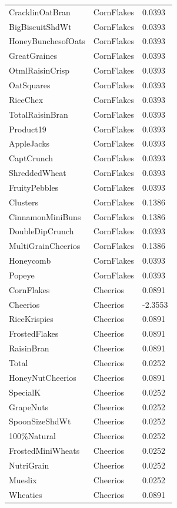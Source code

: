 \begin{table}[!htbp]
\begin{tabular}{lll}
\\
CracklinOatBran & CornFlakes & 0.0393
\\
BigBiscuitShdWt & CornFlakes & 0.0393
\\
HoneyBunchesofOats & CornFlakes & 0.0393
\\
GreatGraines & CornFlakes & 0.0393
\\
OtmlRaisinCrisp & CornFlakes & 0.0393
\\
OatSquares & CornFlakes & 0.0393
\\
RiceChex & CornFlakes & 0.0393
\\
TotalRaisinBran & CornFlakes & 0.0393
\\
Product19 & CornFlakes & 0.0393
\\
AppleJacks & CornFlakes & 0.0393
\\
CaptCrunch & CornFlakes & 0.0393
\\
ShreddedWheat & CornFlakes & 0.0393
\\
FruityPebbles & CornFlakes & 0.0393
\\
Clusters & CornFlakes & 0.1386
\\
CinnamonMiniBuns & CornFlakes & 0.1386
\\
DoubleDipCrunch & CornFlakes & 0.0393
\\
MultiGrainCheerios & CornFlakes & 0.1386
\\
Honeycomb & CornFlakes & 0.0393
\\
Popeye & CornFlakes & 0.0393
\\
CornFlakes & Cheerios & 0.0891
\\
Cheerios & Cheerios & -2.3553
\\
RiceKrispies & Cheerios & 0.0891
\\
FrostedFlakes & Cheerios & 0.0891
\\
RaisinBran & Cheerios & 0.0891
\\
Total & Cheerios & 0.0252
\\
HoneyNutCheerios & Cheerios & 0.0891
\\
SpecialK & Cheerios & 0.0252
\\
GrapeNuts & Cheerios & 0.0252
\\
SpoonSizeShdWt & Cheerios & 0.0252
\\
100\%Natural & Cheerios & 0.0252
\\
FrostedMiniWheats & Cheerios & 0.0252
\\
NutriGrain & Cheerios & 0.0252
\\
Mueslix & Cheerios & 0.0252
\\
Wheaties & Cheerios & 0.0891

\end{tabular}
\end{table}

